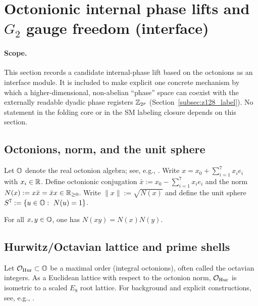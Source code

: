 \section{Octonionic internal phase lifts and \texorpdfstring{$G_2$}{G2} gauge freedom (interface)}
\label{sec:octonion_g2_internal_phase}

\paragraph{Scope.}
\AuditTag This section records a candidate internal-phase lift based on the octonions as an interface module.
It is included to make explicit one concrete mechanism by which a higher-dimensional, non-abelian ``phase'' space can coexist with the externally readable dyadic phase registers $\mathbb{Z}_{2^p}$ (Section~\ref{subsec:z128_label}).
No statement in the folding core or in the SM labeling closure depends on this section.

\subsection{Octonions, norm, and the unit sphere}
\label{subsec:octonions_norm_unit_sphere}

\begin{definition}
\label{def:octonions_conj_norm}
\MathTag Let $\mathbb{O}$ denote the real octonion algebra; see, e.g., \cite{Baez2002}.
Write $x=x_0+\sum_{i=1}^7 x_i e_i$ with $x_i\in\mathbb{R}$.
Define octonionic conjugation $\bar{x}:=x_0-\sum_{i=1}^7 x_i e_i$ and the norm $N(x):=x\bar{x}=\bar{x}x\in\mathbb{R}_{\ge 0}$.
Write $\|x\|:=\sqrt{N(x)}$ and define the unit sphere $S^7:=\{u\in\OO:\ N(u)=1\}$.
\end{definition}

\begin{proposition}
\label{prop:octonion_norm_composition}
\MathTag For all $x,y\in\mathbb{O}$, one has $N(xy)=N(x)N(y)$.
\end{proposition}

\subsection{Hurwitz/Octavian lattice and prime shells}
\label{subsec:hurwitz_lattice_prime_shells}

\begin{definition}
\label{def:hurwitz_octavian_lattice}
\AuditTag Let $\mathcal{O}_{\mathrm{Hur}}\subset\mathbb{O}$ be a maximal order (integral octonions), often called the octavian integers.
As a Euclidean lattice with respect to the octonion norm, $\mathcal{O}_{\mathrm{Hur}}$ is isometric to a scaled $E_8$ root lattice.
\AuditTag For background and explicit constructions, see, e.g., \cite{ConwaySmith2003}.
\end{definition}

